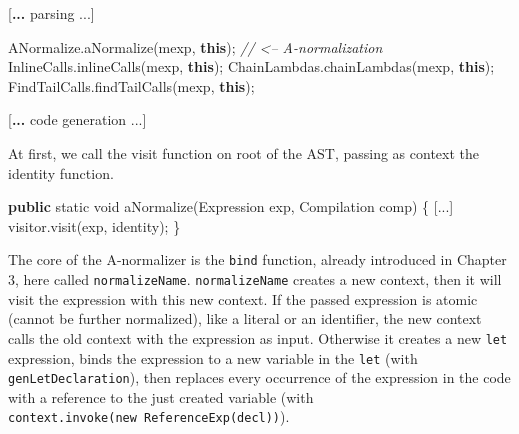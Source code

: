 \documentclass[12pt,a4paper,oneside,openright]{book}
\newenvironment{Shaded}{\begin{snugshade}}{\end{snugshade}}
\newcommand{\KeywordTok}[1]{\textcolor[rgb]{0.13,0.29,0.53}{\textbf{{#1}}}}
\newcommand{\DataTypeTok}[1]{\textcolor[rgb]{0.13,0.29,0.53}{{#1}}}
\newcommand{\CommentTok}[1]{\textcolor[rgb]{0.56,0.35,0.01}{\textit{{#1}}}}
\newcommand{\FunctionTok}[1]{\textcolor[rgb]{0.00,0.00,0.00}{{#1}}}
\newcommand{\NormalTok}[1]{{#1}}
\begin{document}
\begin{Shaded}
\begin{Highlighting}[]
\NormalTok{[}\KeywordTok{... }\NormalTok{parsing ...]}

\NormalTok{ANormalize.}\FunctionTok{aNormalize}\NormalTok{(mexp, }\KeywordTok{this}\NormalTok{); }\CommentTok{// <-- A-normalization}
\NormalTok{InlineCalls.}\FunctionTok{inlineCalls}\NormalTok{(mexp, }\KeywordTok{this}\NormalTok{);}
\NormalTok{ChainLambdas.}\FunctionTok{chainLambdas}\NormalTok{(mexp, }\KeywordTok{this}\NormalTok{);}
\NormalTok{FindTailCalls.}\FunctionTok{findTailCalls}\NormalTok{(mexp, }\KeywordTok{this}\NormalTok{);}

\NormalTok{[}\KeywordTok{... }\NormalTok{code generation  ...]}
\end{Highlighting}
\end{Shaded}

At first, we call the visit function on root of the AST, passing as
context the identity function.

\begin{Shaded}
\begin{Highlighting}[]
\KeywordTok{public} \DataTypeTok{static} \DataTypeTok{void} \FunctionTok{aNormalize}\NormalTok{(Expression exp, Compilation comp) \{}
    \NormalTok{[...]}
    \NormalTok{visitor.}\FunctionTok{visit}\NormalTok{(exp, identity);}
\NormalTok{\}}
\end{Highlighting}
\end{Shaded}

The core of the A-normalizer is the \texttt{bind} function, already
introduced in Chapter 3, here called \texttt{normalizeName}.
\texttt{normalizeName} creates a new context, then it will visit the
expression with this new context. If the passed expression is atomic
(cannot be further normalized), like a literal or an identifier, the new
context calls the old context with the expression as input. Otherwise it
creates a new \texttt{let} expression, binds the expression to a new
variable in the \texttt{let} (with \texttt{genLetDeclaration}), then
replaces every occurrence of the expression in the code with a reference
to the just created variable (with
\texttt{context.invoke(new\ ReferenceExp(decl))}).
\end{document}
